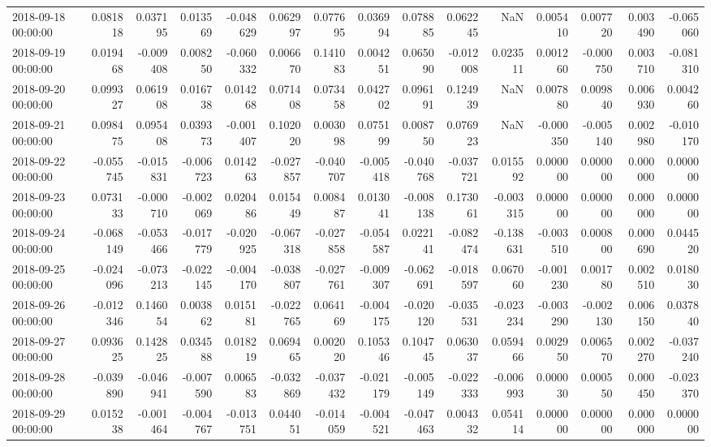 \begin{tabular}{lrrrrrrrrrrrrrr}
2018-09-18 00:00:00 & 0.081818 & 0.037195 & 0.013569 & -0.048629 & 0.062997 & 0.077695 & 0.036994 & 0.078885 & 0.062245 & NaN & 0.005410 & 0.007720 & 0.003490 & -0.065060 \\
2018-09-19 00:00:00 & 0.019468 & -0.009408 & 0.008250 & -0.060332 & 0.006670 & 0.141083 & 0.004251 & 0.065090 & -0.012008 & 0.023511 & 0.001260 & -0.000750 & 0.003710 & -0.081310 \\
2018-09-20 00:00:00 & 0.099327 & 0.061908 & 0.016738 & 0.014268 & 0.071408 & 0.073458 & 0.042702 & 0.096191 & 0.124939 & NaN & 0.007880 & 0.009840 & 0.006930 & 0.004260 \\
2018-09-21 00:00:00 & 0.098475 & 0.095408 & 0.039373 & -0.001407 & 0.102020 & 0.003098 & 0.075199 & 0.008750 & 0.076923 & NaN & -0.000350 & -0.005140 & 0.002980 & -0.010170 \\
2018-09-22 00:00:00 & -0.055745 & -0.015831 & -0.006723 & 0.014263 & -0.027857 & -0.040707 & -0.005418 & -0.040768 & -0.037721 & 0.015592 & 0.000000 & 0.000000 & 0.000000 & 0.000000 \\
2018-09-23 00:00:00 & 0.073133 & -0.000710 & -0.002069 & 0.020486 & 0.015449 & 0.008487 & 0.013041 & -0.008138 & 0.173061 & -0.003315 & 0.000000 & 0.000000 & 0.000000 & 0.000000 \\
2018-09-24 00:00:00 & -0.068149 & -0.053466 & -0.017779 & -0.020925 & -0.067318 & -0.027858 & -0.054587 & 0.022141 & -0.082474 & -0.138631 & -0.003510 & 0.000800 & 0.000690 & 0.044520 \\
2018-09-25 00:00:00 & -0.024096 & -0.073213 & -0.022145 & -0.004170 & -0.038807 & -0.027761 & -0.009307 & -0.062691 & -0.018597 & 0.067060 & -0.001230 & 0.001780 & 0.002510 & 0.018030 \\
2018-09-26 00:00:00 & -0.012346 & 0.146054 & 0.003862 & 0.015181 & -0.022765 & 0.064169 & -0.004175 & -0.020120 & -0.035531 & -0.023234 & -0.003290 & -0.002130 & 0.006150 & 0.037840 \\
2018-09-27 00:00:00 & 0.093625 & 0.142825 & 0.034588 & 0.018219 & 0.069465 & 0.002020 & 0.105346 & 0.104745 & 0.063037 & 0.059466 & 0.002950 & 0.006570 & 0.002270 & -0.037240 \\
2018-09-28 00:00:00 & -0.039890 & -0.046941 & -0.007590 & 0.006583 & -0.032869 & -0.037432 & -0.021179 & -0.005149 & -0.022333 & -0.006993 & 0.000030 & 0.000550 & 0.000450 & -0.023370 \\
2018-09-29 00:00:00 & 0.015238 & -0.001464 & -0.004767 & -0.013751 & 0.044051 & -0.014059 & -0.004521 & -0.047463 & 0.004332 & 0.054114 & 0.000000 & 0.000000 & 0.000000 & 0.000000 \\

\end{tabular}
